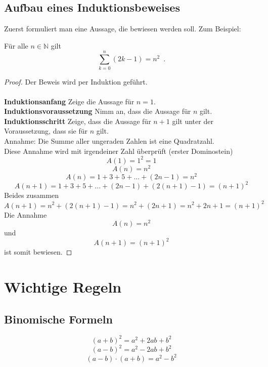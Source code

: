 \documentclass[11pt, a4paper]{article}
\begin{document}
\subsection*{Aufbau eines Induktionsbeweises}
Zuerst formuliert man eine Aussage, die bewiesen werden soll. Zum Beispiel:
\begin{satz}
Für alle $n \in \mathbb{N}$ gilt
\[
\sum_{k=0}^{n}(2k-1) = n^{2} \enspace.
\]
\end{satz}
\begin{proof} Der Beweis wird per Induktion geführt.\\\\
\textbf{Induktionsanfang}
Zeige die Aussage für $n=1$.\\
\textbf{Induktionsvoraussetzung}
Nimm an, dass die Aussage für $n$ gilt.\\
\textbf{Induktionsschritt}
Zeige, dass die Aussage für $n+1$ gilt unter der Voraussetzung, dass sie für $n$ gilt.\\
Annahme: Die Summe aller ungeraden Zahlen ist eine Quadratzahl.\\
Diese Annahme wird mit irgendeiner Zahl überprüft (erster Dominostein)
\[A(1) = 1^{2} = 1\]
\[A(n) = n^{2}\]
\[A(n) = 1+3+5+ ... + (2n-1) = n^{2}\]
\[A(n+1) = 1+3+5+ ... + (2n-1) + (2(n+1)-1) = (n+1)^{2}\]
Beides zusammen
\[A(n+1) = n^{2} + (2(n+1)-1) = n^{2} + (2n+1) = n^{2} + 2n + 1 = (n+1)^{2}\]
Die Annahme
\[A(n) = n^{2}\]
und
\[A(n+1) = (n+1)^{2}\]
ist somit bewiesen.
\end{proof}

\section{Wichtige Regeln}
\subsection{Binomische Formeln}
\[(a+b)^{2} = a^{2} + 2ab + b^{2}\]
\[(a-b)^{2} = a^{2} - 2ab + b^{2}\]
\[(a-b)\cdot(a+b) = a^{2}-b^{2}\]
\end{document}

